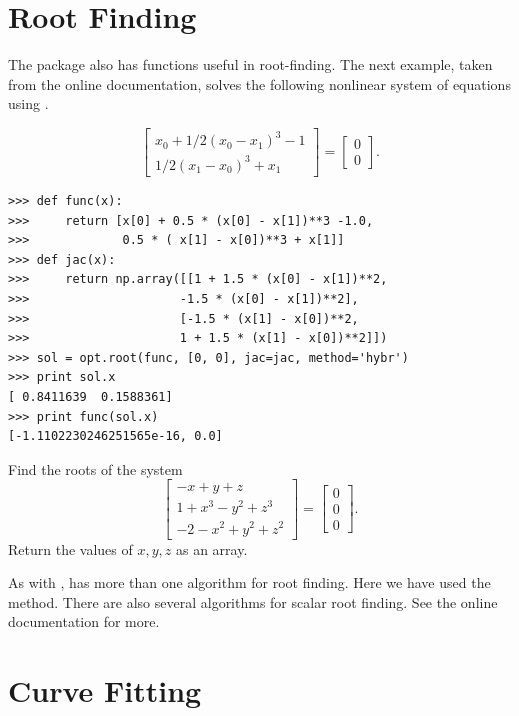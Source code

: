 \section*{Root Finding}

The  package also has functions useful in root-finding.
The next example, taken from the online documentation, solves the following nonlinear system of equations using .

\[
\begin{bmatrix}
	x_{0} + 1/2 ( x_{0} - x_{1} )^{3} - 1 \\
	1/2(x_{1}-x_{0})^{3} + x_{1}
\end{bmatrix} =
\begin{bmatrix}
	0 \\
	0
\end{bmatrix}.
\]

\begin{lstlisting}
>>> def func(x):
>>>     return [x[0] + 0.5 * (x[0] - x[1])**3 -1.0,
>>>             0.5 * ( x[1] - x[0])**3 + x[1]]
>>> def jac(x):
>>>     return np.array([[1 + 1.5 * (x[0] - x[1])**2,
>>>                     -1.5 * (x[0] - x[1])**2],
>>>                     [-1.5 * (x[1] - x[0])**2,
>>>                     1 + 1.5 * (x[1] - x[0])**2]])
>>> sol = opt.root(func, [0, 0], jac=jac, method='hybr')
>>> print sol.x
[ 0.8411639  0.1588361]
>>> print func(sol.x)
[-1.1102230246251565e-16, 0.0]
\end{lstlisting}

\begin{problem}
Find the roots of the system
\[
\begin{bmatrix}
	-x+y+z \\
	1+x^3-y^2+z^3\\
	-2-x^2+y^2+z^2
\end{bmatrix} =
\begin{bmatrix}
	0 \\
	0 \\
	0
\end{bmatrix} .
\]
Return the values of $x,y,z$ as an array.
\end{problem}



As with ,  has more than one algorithm for root finding.
Here we have used the  method. 
There are also several algorithms for scalar root finding. See the online documentation for more.

\section*{Curve Fitting}

